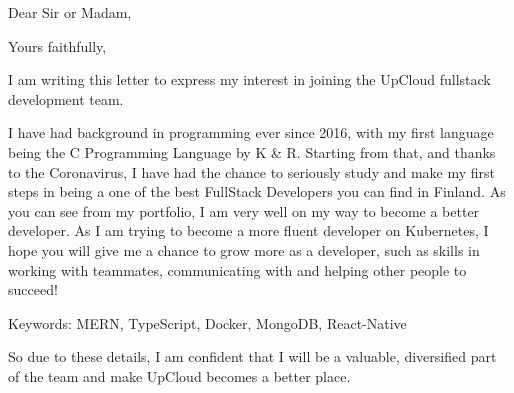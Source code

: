 \documentclass[11pt,a4paper,sans]{moderncv}
\begin{document}
  \clearpage

  \date{February 1, 2021}
  \opening{Dear Sir or Madam,}
  \closing{Yours faithfully,}
  \makelettertitle

  I am writing this letter to express my interest in joining the UpCloud
  fullstack development team.

  I have had background in programming ever since 2016, with my
  first language being the C Programming Language by K \& R. Starting
  from that, and thanks to the Coronavirus, I have had the chance
  to seriously study and make my first steps in being a
  one of the best FullStack Developers you can find in Finland.
  As you can see from my portfolio, I am very well on my way to become
  a better developer. As I am trying to become a more fluent developer on Kubernetes,
  I hope you will give me a chance to grow more as a developer,
  such as skills in working with teammates, communicating with and helping other
  people to succeed!

  Keywords: MERN, TypeScript, Docker, MongoDB, React-Native

  So due to these details, I am confident that I will be a valuable, diversified
  part of the team and make UpCloud becomes a better place.

  \makeletterclosing
\end{document}
